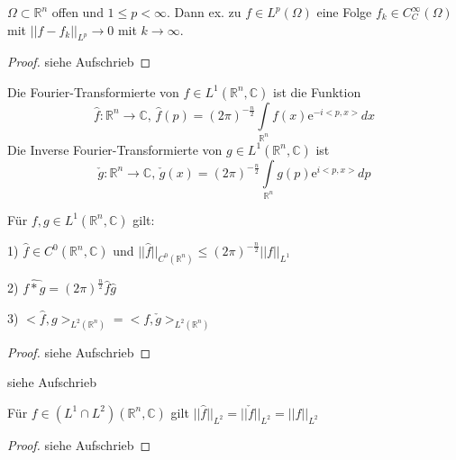 \begin{theorem}
	$\Omega \subset\mathbb{R}^n$ offen und $1\leq p < \infty$. Dann ex. zu $f\in L^p(\Omega)$ eine Folge $f_k \in C^\infty_C(\Omega)$ mit $||f-f_k||_{L^p}\to 0$ mit $k \to \infty$. 
\end{theorem}
\begin{proof}
	siehe Aufschrieb
\end{proof}

\begin{definition}
	Die Fourier-Transformierte von $f\in L^1(\mathbb{R}^n, \mathbb{C})$ ist die Funktion 
	$$\hat{f}: \mathbb{R}^n \to \mathbb{C}\text{, } \hat{f}(p) = (2\pi)^{-\frac{n}{2}} \int\limits_{\mathbb{R}^n} f(x) \text{e}^{-i<p,x>}dx$$
	Die Inverse Fourier-Transformierte von $g\in L^1(\mathbb{R}^n, \mathbb{C})$ ist $$
	\check{g}:\mathbb{R}^n \to \mathbb{C}\text{, } \check{g}(x) = (2\pi)^{-\frac{n}{2}} \int\limits_{\mathbb{R}^n} g(p) \text{e}^{i<p,x>}dp$$
\end{definition}

\begin{theorem}
	Für $f,g\in L^1(\mathbb{R}^n,\mathbb{C})$ gilt:
	\item[1)] $\hat{f}\in C^0(\mathbb{R}^n,\mathbb{C})$ und $||\hat{f}||_{C^0(\mathbb{R}^n)} \leq (2\pi)^{-\frac{n}{2}}||f||_{L^1}$
	\item[2)] $\widehat{f\ast g} = (2\pi)^{\frac{n}{2}}\hat{f}\hat{g}$
	\item[3)] $<\hat{f},g>_{L^2(\mathbb{R}^n)} = < f,\check{g}>_{L^2(\mathbb{R}^n)}$
\end{theorem}
\begin{proof}
	siehe Aufschrieb 
\end{proof}

\begin{example}
	siehe Aufschrieb
\end{example}

\begin{theorem}[Plancherel]
	Für $f\in (L^1\cap L^2)(\mathbb{R}^n,\mathbb{C})$ gilt $||\hat{f}||_{L^2} = ||\check{f}||_{L^2} = ||f||_{L^2}$
\end{theorem}

\begin{proof}
	siehe Aufschrieb
\end{proof}

